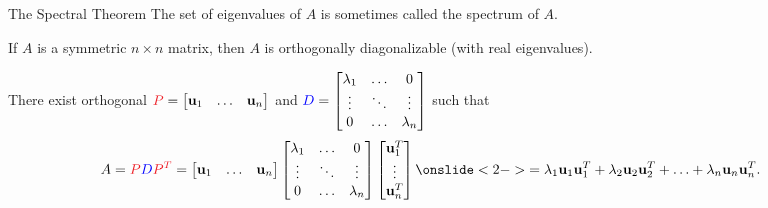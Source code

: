 \documentclass[xcolor=dvipsnames,aspectratio=169,t]{beamer}
\begin{document}
\begin{frame}{The Spectral Theorem}
  The set of eigenvalues of $A$ is sometimes called the \alert{spectrum} of $A$.
  
  \begin{theorem}
    If $A$ is a \alert{symmetric} $n\times n$ matrix, then $A$ is \alert{orthogonally diagonalizable} (with real eigenvalues).
  \end{theorem}
  
  There exist \alert{orthogonal} $\colorr{P}=\begin{bmatrix}\u_1 & \ldots & \u_n\end{bmatrix}$
  and  $\textcolor{blue}{D}=\begin{bmatrix} \lambda_1 & \ldots & 0 \\ 
                                                    \vdots & \ddots & \vdots \\
                                                    0 & \ldots & \lambda_n 
                                    \end{bmatrix}$ such that
  \begin{align*}
    A & = \colorr{P}\colorb{D}\colorr{P^T} = 
      \begin{bmatrix}\u_1 & \ldots & \u_n\end{bmatrix}
      \begin{bmatrix} \lambda_1 & \ldots & 0 \\ 
                      \vdots & \ddots & \vdots \\
                      0 & \ldots & \lambda_n 
      \end{bmatrix}
      \begin{bmatrix}\u_1^T \\ \vdots \\ \u_n^T\end{bmatrix}
    \onslide<2->{
      = \lambda_1 \u_1 \u_1^T + \lambda_2 \u_2 \u_2^T + \ldots + \lambda_n \u_n \u_n^T.
    }
  \end{align*}
  
\end{frame}
\end{document}
